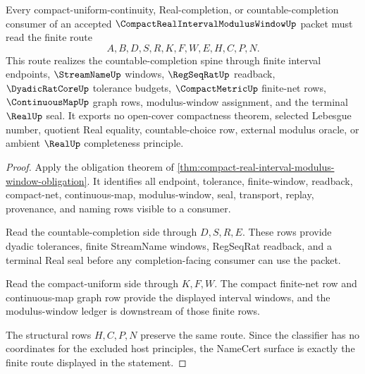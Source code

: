 \begin{theorem}
\label{thm:compact-real-interval-modulus-window-namecert-surface}
Every compact-uniform-continuity, Real-completion, or countable-completion consumer of an accepted $\CompactRealIntervalModulusWindowUp$ packet must read the finite route
$$
A,B,D,S,R,K,F,W,E,H,C,P,N .
$$
This route realizes the countable-completion spine through finite interval endpoints, $\StreamNameUp$ windows, $\RegSeqRatUp$ readback, $\DyadicRatCoreUp$ tolerance budgets, $\CompactMetricUp$ finite-net rows, $\ContinuousMapUp$ graph rows, modulus-window assignment, and the terminal $\RealUp$ seal. It exports no open-cover compactness theorem, selected Lebesgue number, quotient Real equality, countable-choice row, external modulus oracle, or ambient $\RealUp$ completeness principle.
\end{theorem}
\begin{proof}
Apply the obligation theorem of \autoref{thm:compact-real-interval-modulus-window-obligation}. It identifies all endpoint, tolerance, finite-window, readback, compact-net, continuous-map, modulus-window, seal, transport, replay, provenance, and naming rows visible to a consumer.

Read the countable-completion side through $D,S,R,E$. These rows provide dyadic tolerances, finite StreamName windows, RegSeqRat readback, and a terminal Real seal before any completion-facing consumer can use the packet.

Read the compact-uniform side through $K,F,W$. The compact finite-net row and continuous-map graph row provide the displayed interval windows, and the modulus-window ledger is downstream of those finite rows.

The structural rows $H,C,P,N$ preserve the same route. Since the classifier has no coordinates for the excluded host principles, the NameCert surface is exactly the finite route displayed in the statement.
\end{proof}



